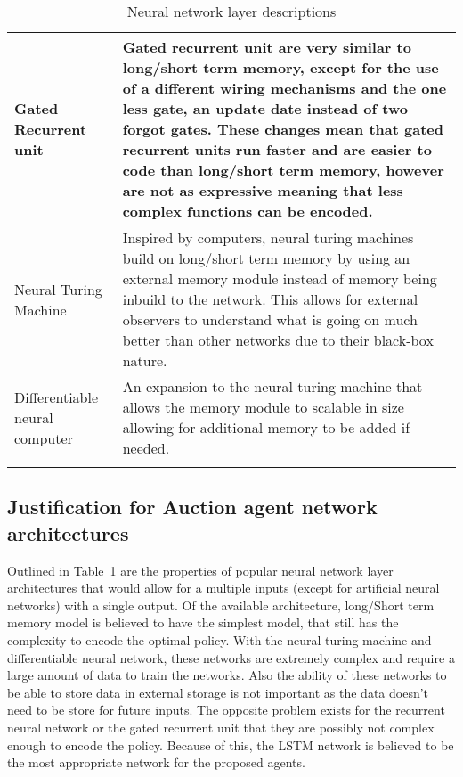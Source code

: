 \begin{longtable}{|p{3.5cm}|p{11cm}|}
    Gated Recurrent unit~\citep{GRU} & Gated recurrent unit are very similar to long/short term memory, except for the
        use of a different wiring mechanisms and the one less gate, an update date instead of two forgot gates.
        These changes mean that gated recurrent units run faster and are easier to code than
        long/short term memory, however are not as expressive meaning that less complex functions can be encoded. \\ \hline

    Neural Turing Machine~\citep{NTM} & Inspired by computers, neural turing machines build on long/short term memory
        by using an external memory module instead of memory being inbuild to the network. This allows for external
        observers to understand what is going on much better than other networks due to their black-box nature. \\ \hline

    Differentiable neural computer~\citep{DNC} & An expansion to the neural turing machine that allows the memory
        module to scalable in size allowing for additional memory to be added if needed. \\ \hline
    \caption{Neural network layer descriptions}
    \label{tab:neural_network_layers}
\end{longtable}

\subsection{Justification for Auction agent network architectures}\label{subsec:justification-for-auction-agent-network-architectures}
Outlined in Table~\ref{tab:neural_network_layers} are the properties of popular neural network layer architectures that
would allow for a multiple inputs (except for artificial neural networks) with a single output. Of the available architecture, long/Short
term memory model is believed to have the simplest model, that still has the complexity to encode the optimal policy. With the neural turing
machine and differentiable neural network, these networks are extremely complex and require a large amount of data to
train the networks. Also the ability of these networks to be able to store data in external storage is not important as
the data doesn't need to be store for future inputs. The opposite problem exists for the recurrent neural network or
the gated recurrent unit that they are possibly not complex enough to encode the policy. Because of this, the LSTM
network is believed to be the most appropriate network for the proposed agents.

